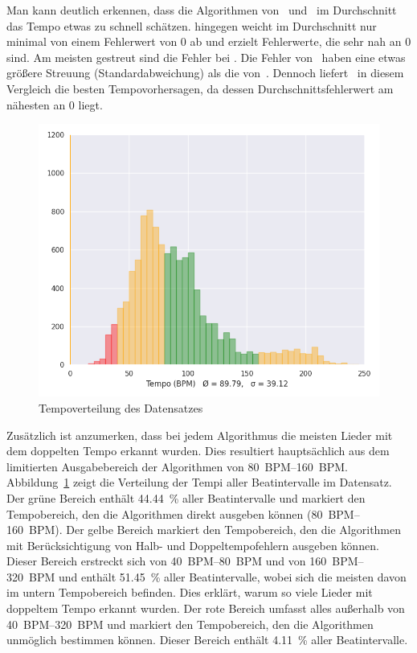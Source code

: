 {{		%
		Man kann deutlich erkennen,
			dass die Algorithmen von~\cite{2001_BeatThis} und~\cite{2011_PlRoSt} im Durchschnitt das Tempo etwas zu schnell schätzen.
		\cite{2009_DaPlSt} hingegen weicht im Durchschnitt nur minimal von einem Fehlerwert von 0 ab
			und erzielt Fehlerwerte,
			die sehr nah an 0 sind.
		Am meisten gestreut sind die Fehler bei \cite{2001_BeatThis}.
		Die Fehler von~\cite{2009_DaPlSt} haben eine etwas grö{\ss}ere Streuung (Standardabweichung) als die von~\cite{2011_PlRoSt}.
		Dennoch liefert~\cite{2009_DaPlSt} in diesem Vergleich die besten Tempovorhersagen,
			da dessen Durchschnittsfehlerwert am nähesten an \num{0} liegt.

		\begin{figure}[h]
			\centering
			\includegraphics[scale=0.45]{resources/dataset_tempo_histogram.png}
			\caption{Tempoverteilung des Datensatzes}
			\label{fig:dataset_tempo}
		\end{figure}

		Zusätzlich ist anzumerken,
			dass bei jedem Algorithmus die meisten Lieder mit dem doppelten Tempo erkannt wurden.
		Dies resultiert hauptsächlich aus dem limitierten Ausgabebereich der Algorithmen von \SIrange{80}{160}{\ac{BPM}}.
		Abbildung~\ref{fig:dataset_tempo} zeigt die Verteilung der Tempi aller Beatintervalle im Datensatz.
		Der grüne Bereich enthält \SI{44.44}{\percent} aller Beatintervalle
			und markiert den Tempobereich,
			den die Algorithmen direkt ausgeben können (\SIrange{80}{160}{\ac{BPM}}).
		Der gelbe Bereich markiert den Tempobereich,
			den die Algorithmen mit Berücksichtigung von Halb- und Doppeltempofehlern ausgeben können.
		Dieser Bereich erstreckt sich von \SIrange{40}{80}{\ac{BPM}} und von \SIrange{160}{320}{\ac{BPM}}
			und enthält \SI{51.45}{\percent} aller Beatintervalle,
			wobei sich die meisten davon im untern Tempobereich befinden.
		Dies erklärt,
			warum so viele Lieder mit doppeltem Tempo erkannt wurden.
		Der rote Bereich umfasst alles au{\ss}erhalb von \SIrange{40}{320}{\ac{BPM}}
			und markiert den Tempobereich,
			den die Algorithmen unmöglich bestimmen können.
		Dieser Bereich enthält \SI{4.11}{\percent} aller Beatintervalle.
	}

}

